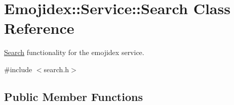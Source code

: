 \hypertarget{classEmojidex_1_1Service_1_1Search}{}\section{Emojidex\+:\+:Service\+:\+:Search Class Reference}
\label{classEmojidex_1_1Service_1_1Search}


\hyperlink{classEmojidex_1_1Service_1_1Search}{Search} functionality for the emojidex service.  




{\ttfamily \#include $<$search.\+h$>$}

\subsection*{Public Member Functions}
